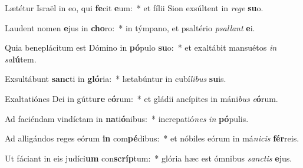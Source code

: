 \item Lætétur Israël in eo, qui \textbf{fe}cit \textbf{e}um:~* et fílii Sion exsúltent in \textit{re}\textit{ge} \textbf{su}o.
\item Laudent nomen \textbf{e}jus in \textbf{cho}ro:~* in týmpano, et psaltério \textit{psal}\textit{lant} \textbf{e}i.
\item Quia beneplácitum est Dómino in \textbf{pó}pulo \textbf{su}o:~* et exaltábit mansuétos \textit{in} \textit{sa}\textbf{lú}tem.
\item Exsultábunt \textbf{sanc}ti in \textbf{gló}ria:~* lætabúntur in cubí\textit{li}\textit{bus} \textbf{su}is.
\item Exaltatiónes Dei in gúttu\textbf{re} e\textbf{ó}rum:~* et gládii ancípites in máni\textit{bus} \textit{e}\textbf{ó}rum.
\item Ad faciéndam vindíctam in \textbf{na}ti\textbf{ó}nibus:~* increpatió\textit{nes} \textit{in} \textbf{pó}pulis.
\item Ad alligándos reges eórum \textbf{in} com\textbf{pé}dibus:~* et nóbiles eórum in má\textit{ni}\textit{cis} \textbf{fér}reis.
\item Ut fáciant in eis judíci\textbf{um} con\textbf{scríp}tum:~* glória hæc est ómnibus \textit{sanc}\textit{tis} \textbf{e}jus.
